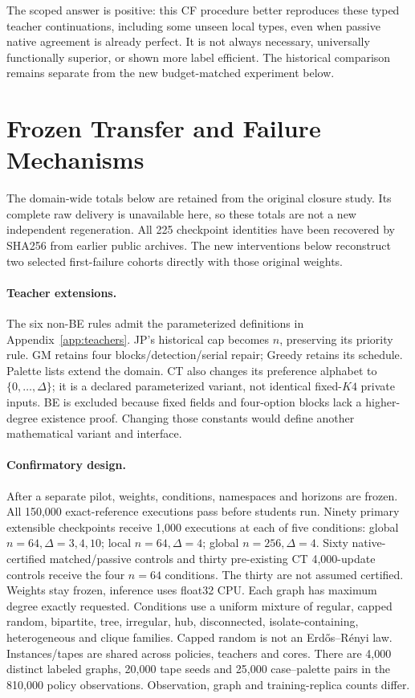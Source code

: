 \documentclass[10pt]{article}
\begin{document}
The scoped answer is positive: this CF procedure better reproduces these
typed teacher continuations, including some unseen local types, even when
passive native agreement is already perfect. It is not always necessary,
universally functionally superior, or shown more label efficient. The historical comparison remains separate from the new budget-matched
experiment below.



\section{Frozen Transfer and Failure Mechanisms}\label{sec:generalization}
The domain-wide totals below are retained from the original closure study.
Its complete raw delivery is unavailable here, so these totals are not a new
independent regeneration. All 225 checkpoint identities have been recovered
by SHA256 from earlier public archives. The new interventions below reconstruct
two selected first-failure cohorts directly with those original weights.
\paragraph{Teacher extensions.}
The six non-BE rules admit the parameterized definitions in
Appendix~\ref{app:teachers}. JP's historical cap becomes $n$, preserving its
priority rule. GM retains four blocks/detection/serial repair; Greedy retains
its schedule. Palette lists extend the domain. CT also changes its preference
alphabet to $\{0,\ldots,\Delta\}$; it is a declared parameterized variant,
not identical fixed-$K4$ private inputs. BE is excluded because fixed fields
and four-option blocks lack a higher-degree existence proof. Changing those
constants would define another mathematical variant and interface.

\paragraph{Confirmatory design.}
After a separate pilot, weights, conditions, namespaces and horizons are
frozen. All 150,000 exact-reference executions pass before students run.
Ninety primary extensible checkpoints receive 1,000 executions at each of
five conditions: global $n=64,\Delta=3,4,10$; local $n=64,\Delta=4$;
global $n=256,\Delta=4$. Sixty native-certified matched/passive controls
and thirty pre-existing CT 4,000-update controls receive the four $n=64$
conditions. The thirty are not assumed certified. Weights stay frozen,
inference uses float32 CPU.
Each graph has maximum degree exactly requested. Conditions use a uniform
mixture of regular, capped random, bipartite, tree, irregular, hub,
disconnected, isolate-containing, heterogeneous and clique families. Capped
random is not an Erd\H{o}s--R\'enyi law. Instances/tapes are shared across
policies, teachers and cores. There are 4,000 distinct labeled graphs,
20,000 tape seeds and 25,000 case--palette pairs in the 810,000 policy
observations. Observation, graph and training-replica counts differ.
\end{document}
